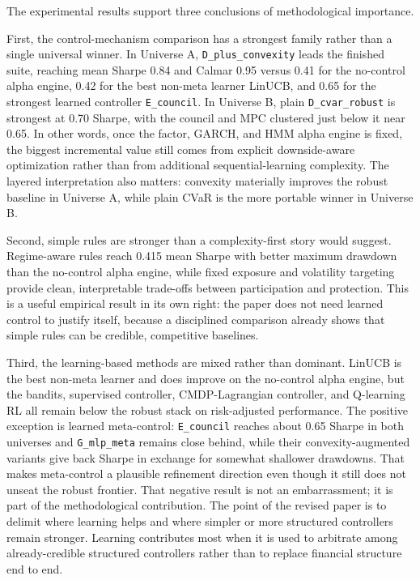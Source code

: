 \documentclass[10pt,twocolumn]{article}
\begin{document}
The experimental results support three conclusions of methodological importance.

First, the control-mechanism comparison has a strongest family rather than a
single universal winner. In Universe A, \texttt{D\_plus\_convexity} leads the
finished suite, reaching mean Sharpe 0.84 and Calmar 0.95 versus 0.41 for the
no-control alpha engine, 0.42 for the best non-meta learner LinUCB, and 0.65
for the strongest learned controller \texttt{E\_council}. In Universe B, plain
\texttt{D\_cvar\_robust} is strongest at 0.70 Sharpe, with the council and
MPC clustered just below it near 0.65. In other words, once the factor, GARCH,
and HMM alpha engine is fixed, the biggest incremental value still comes from
explicit downside-aware optimization rather than from additional
sequential-learning complexity. The layered interpretation also matters:
convexity materially improves the robust baseline in Universe A, while plain
CVaR is the more portable winner in Universe B.

Second, simple rules are stronger than a complexity-first story would suggest.
Regime-aware rules reach 0.415 mean Sharpe with better maximum drawdown than
the no-control alpha engine, while fixed exposure and volatility targeting provide
clean, interpretable trade-offs between participation and protection. This is a
useful empirical result in its own right: the paper does not need learned
control to justify itself, because a disciplined comparison already shows that
simple rules can be credible, competitive baselines.

Third, the learning-based methods are mixed rather than dominant. LinUCB is the
best non-meta learner and does improve on the no-control alpha engine, but the
bandits, supervised controller, CMDP-Lagrangian controller, and Q-learning RL
all remain below the robust stack on risk-adjusted performance. The positive
exception is learned meta-control: \texttt{E\_council} reaches about 0.65
Sharpe in both universes and \texttt{G\_mlp\_meta} remains close behind, while
their convexity-augmented variants give back Sharpe in exchange for somewhat
shallower drawdowns. That makes meta-control a plausible refinement direction
even though it still does not unseat the robust frontier. That negative result
is not an embarrassment; it is part of the methodological contribution. The
point of the revised paper is to delimit where learning helps and where
simpler or more structured controllers remain stronger. Learning contributes
most when it is used to arbitrate among already-credible structured
controllers rather than to replace financial structure end to end.
\end{document}
